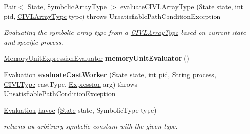 \begin{DoxyCompactItemize}
\item 
\hyperlink{classedu_1_1udel_1_1cis_1_1vsl_1_1civl_1_1util_1_1IF_1_1Pair}{Pair}$<$ \hyperlink{interfaceedu_1_1udel_1_1cis_1_1vsl_1_1civl_1_1state_1_1IF_1_1State}{State}, Symbolic\+Array\+Type $>$ \hyperlink{interfaceedu_1_1udel_1_1cis_1_1vsl_1_1civl_1_1semantics_1_1IF_1_1Evaluator_ae7f6a8345e28f9538b9a6058d939b24f}{evaluate\+C\+I\+V\+L\+Array\+Type} (\hyperlink{interfaceedu_1_1udel_1_1cis_1_1vsl_1_1civl_1_1state_1_1IF_1_1State}{State} state, int pid, \hyperlink{interfaceedu_1_1udel_1_1cis_1_1vsl_1_1civl_1_1model_1_1IF_1_1type_1_1CIVLArrayType}{C\+I\+V\+L\+Array\+Type} type)  throws Unsatisfiable\+Path\+Condition\+Exception
\begin{DoxyCompactList}\small\item\em Evaluating the symbolic array type from a \hyperlink{}{C\+I\+V\+L\+Array\+Type} based on current state and specific process. \end{DoxyCompactList}\item 
\hypertarget{interfaceedu_1_1udel_1_1cis_1_1vsl_1_1civl_1_1semantics_1_1IF_1_1Evaluator_ab1d1677a6a17f256097a27be49a5f359}{}\hyperlink{interfaceedu_1_1udel_1_1cis_1_1vsl_1_1civl_1_1semantics_1_1IF_1_1MemoryUnitExpressionEvaluator}{Memory\+Unit\+Expression\+Evaluator} {\bfseries memory\+Unit\+Evaluator} ()\label{interfaceedu_1_1udel_1_1cis_1_1vsl_1_1civl_1_1semantics_1_1IF_1_1Evaluator_ab1d1677a6a17f256097a27be49a5f359}

\item 
\hypertarget{interfaceedu_1_1udel_1_1cis_1_1vsl_1_1civl_1_1semantics_1_1IF_1_1Evaluator_a818296dda87a957ea427cb40e0acb3f2}{}\hyperlink{classedu_1_1udel_1_1cis_1_1vsl_1_1civl_1_1semantics_1_1IF_1_1Evaluation}{Evaluation} {\bfseries evaluate\+Cast\+Worker} (\hyperlink{interfaceedu_1_1udel_1_1cis_1_1vsl_1_1civl_1_1state_1_1IF_1_1State}{State} state, int pid, String process, \hyperlink{interfaceedu_1_1udel_1_1cis_1_1vsl_1_1civl_1_1model_1_1IF_1_1type_1_1CIVLType}{C\+I\+V\+L\+Type} cast\+Type, \hyperlink{interfaceedu_1_1udel_1_1cis_1_1vsl_1_1civl_1_1model_1_1IF_1_1expression_1_1Expression}{Expression} arg)  throws Unsatisfiable\+Path\+Condition\+Exception\label{interfaceedu_1_1udel_1_1cis_1_1vsl_1_1civl_1_1semantics_1_1IF_1_1Evaluator_a818296dda87a957ea427cb40e0acb3f2}

\item 
\hyperlink{classedu_1_1udel_1_1cis_1_1vsl_1_1civl_1_1semantics_1_1IF_1_1Evaluation}{Evaluation} \hyperlink{interfaceedu_1_1udel_1_1cis_1_1vsl_1_1civl_1_1semantics_1_1IF_1_1Evaluator_a292a5f3000d30fc6e72a181faf80f8b1}{havoc} (\hyperlink{interfaceedu_1_1udel_1_1cis_1_1vsl_1_1civl_1_1state_1_1IF_1_1State}{State} state, Symbolic\+Type type)
\begin{DoxyCompactList}\small\item\em returns an arbitrary symbolic constant with the given type. \end{DoxyCompactList}\end{DoxyCompactItemize}


